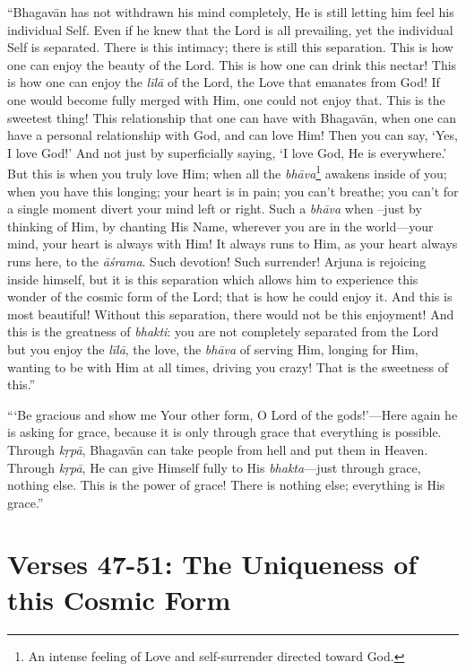 \enquote{Bhagavān has not withdrawn his mind completely, He is still letting him feel his individual Self. Even if he knew that the Lord is all prevailing, yet the individual Self is separated. There is this intimacy; there is still this separation. This is how one can enjoy the beauty of the Lord. This is how one can drink this nectar! This is how one can enjoy the \textit{līlā} of the Lord, the Love that emanates from God! If one would become fully merged with Him, one could not enjoy that. This is the sweetest thing! This relationship that one can have with Bhagavān, when one can have a personal relationship with God, and can love Him! Then you can say, \enquote{Yes, I love God!} And not just by superficially saying, \enquote{I love God, He is everywhere.} But this is when you truly love Him; when all the \textit{bhāva}\footnote{An intense feeling of Love and self-surrender directed toward God.} awakens inside of you; when you have this longing; your heart is in pain; you can’t breathe; you can’t for a single moment divert your mind left or right. Such a \textit{bhāva} when –just by thinking of Him, by chanting His Name, wherever you are in the world---your mind, your heart is always with Him! It always runs to Him, as your heart always runs here, to the \textit{āśrama}. Such devotion! Such surrender! Arjuna is rejoicing inside himself, but it is this separation which allows him to experience this wonder of the cosmic form of the Lord; that is how he could enjoy it. And this is most beautiful! Without this separation, there would not be this enjoyment! And this is the greatness of \textit{bhakti}: you are not completely separated from the Lord but you enjoy the \textit{līlā}, the love, the \textit{bhāva} of serving Him, longing for Him, wanting to be with Him at all times, driving you crazy! That is the sweetness of this.}

\enquote{\enquote{Be gracious and show me Your other form, O Lord of the gods!}---Here again he is asking for grace, because it is only through grace that everything is possible. Through \textit{kṛpā}, Bhagavān can take people from hell and put them in Heaven. Through \textit{kṛpā}, He can give Himself fully to His \textit{bhakta}---just through grace, nothing else. This is the power of grace! There is nothing else; everything is His grace.}

\section{Verses 47-51: The Uniqueness of this Cosmic Form}\label{sec-verses-47-51-the-uniqueness-of-this-cosmic-form}


